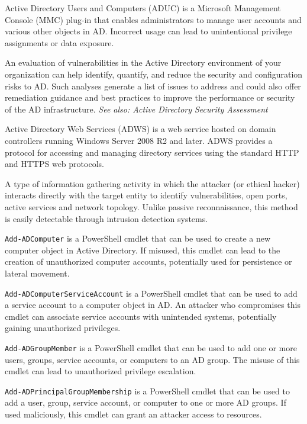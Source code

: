  Active Directory Users and Computers (ADUC) is a Microsoft Management Console (MMC) plug-in that enables administrators to manage user accounts and various other objects in AD. Incorrect usage can lead to unintentional privilege assignments or data exposure.

An evaluation of vulnerabilities in the Active Directory environment of your organization can help identify, quantify, and reduce the security and configuration risks to AD. Such analyses generate a list of issues to address and could also offer remediation guidance and best practices to improve the performance or security of the AD infrastructure.
\textit{See also: Active Directory Security Assessment}

Active Directory Web Services (ADWS) is a web service hosted on domain controllers running Windows Server 2008 R2 and later. ADWS provides a protocol for accessing and managing directory services using the standard HTTP and HTTPS web protocols.

 A type of information gathering activity in which the attacker (or ethical hacker) interacts directly with the target entity to identify vulnerabilities, open ports, active services and network topology. Unlike passive reconnaissance, this method is easily detectable through intrusion detection systems.

\texttt{Add-ADComputer} is a PowerShell cmdlet that can be used to create a new computer object in Active Directory. If misused, this cmdlet can lead to the creation of unauthorized computer accounts, potentially used for persistence or lateral movement.

\texttt{Add-ADComputerServiceAccount} is a PowerShell cmdlet that can be used to add a service account to a computer object in AD. An attacker who compromises this cmdlet can associate service accounts with unintended systems, potentially gaining unauthorized privileges.

\texttt{Add-ADGroupMember} is a PowerShell cmdlet that can be used to add one or more users, groups, service accounts, or computers to an AD group. The misuse of this cmdlet can lead to unauthorized privilege escalation.

\texttt{Add-ADPrincipalGroupMembership} is a PowerShell cmdlet that can be used to add a user, group, service account, or computer to one or more AD groups. If used maliciously, this cmdlet can grant an attacker access to resources.

